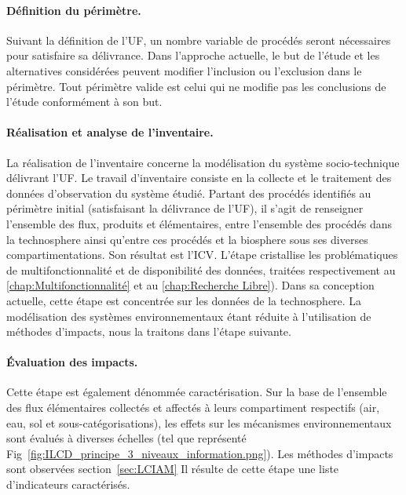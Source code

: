 \paragraph{Définition du périmètre.}
Suivant la définition de l'\gls{UF}, un nombre variable de procédés seront nécessaires pour satisfaire sa délivrance.
Dans l'approche actuelle, le but de l'étude et les alternatives considérées peuvent modifier l'inclusion ou l'exclusion dans le périmètre.
Tout périmètre valide est celui qui ne modifie pas les conclusions de l'étude conformément à son but.
\paragraph{Réalisation et analyse de l'inventaire.}
La réalisation de l'inventaire concerne la modélisation du système socio-technique délivrant l'\gls{UF}.
Le travail d'inventaire consiste en la collecte et le traitement des données d'observation du système étudié.
Partant des procédés identifiés au périmètre initial (satisfaisant la délivrance de l'\gls{UF}), il s'agit de renseigner l'ensemble des flux, produits et élémentaires, entre l'ensemble des procédés dans la \gls{technosphere} ainsi qu'entre ces procédés et la \gls{biosphere} sous ses diverses compartimentations.
Son résultat est l'\gls{ICV}.
L'étape cristallise les problématiques de multifonctionnalité et de disponibilité des données, traitées respectivement au \ref{chap:Multifonctionnalité} et au \ref{chap:Recherche Libre}).
Dans sa conception actuelle, cette étape est concentrée sur les données de la \gls{technosphere}.
La modélisation des systèmes environnementaux étant réduite à l'utilisation de méthodes d'impacts, nous la traitons dans l'étape suivante.

\paragraph{Évaluation des impacts.}
Cette étape est également dénommée caractérisation.
Sur la base de l'ensemble des flux élémentaires collectés et affectés à leurs compartiment respectifs (air, eau, sol et sous-catégorisations), les effets sur les mécanismes environnementaux sont évalués à diverses échelles (tel que représenté Fig~\ref{fig:ILCD_principe_3_niveaux_information.png}).
Les méthodes d'impacts sont observées section~\ref{sec:LCIAM}
Il résulte de cette étape une liste d'indicateurs caractérisés.
